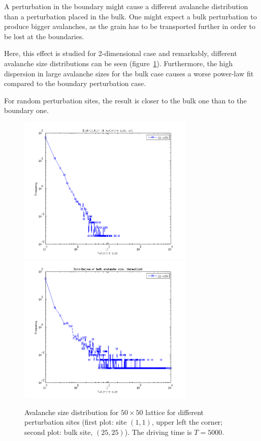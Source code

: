 A perturbation in the boundary might cause a different avalanche distribution than a perturbation placed in the bulk. One might expect a bulk perturbation to produce bigger avalanches, as the grain has to be transported further in order to be lost at the boundaries.

Here, this effect is studied for 2-dimensional case and remarkably, different avalanche size distributions can be seen (figure~\ref{sv}). Furthermore, the high dispersion in large avalanche sizes for the bulk case causes a worse power-law fit compared to the boundary perturbation case.

For random perturbation sites, the result is closer to the bulk one than to the boundary one.

\begin{figure} 
\begin{center}
\includegraphics[width=0.75\textwidth]{results/sv1.png}
\includegraphics[width=0.75\textwidth]{results/sbulk_th.png} 
\caption{Avalanche size distribution for $50\times50$ lattice for different perturbation sites (first plot: site $(1,1)$, upper left the corner; second plot: bulk site, $(25,25)$). The driving time is $T=5000$.}
\label{sv}
\end{center}
\end{figure} 


